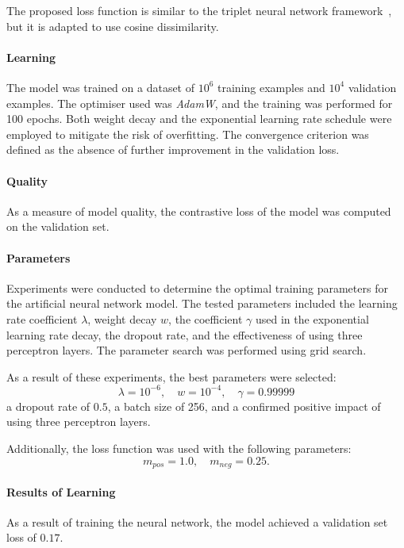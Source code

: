 \documentclass[biomedinformatics,article,submit,moreauthors]{Definitions/mdpi}
\begin{document}
                The proposed loss function is similar to the triplet neural network framework~\citep{hoffer2018deepmetriclearningusing}, but it is adapted to use cosine dissimilarity.

                \paragraph{Learning}
                The model was trained on a dataset of $10^{6}$ training examples and $10^{4}$ validation examples. The optimiser used was \textit{AdamW}, and the training was performed for 100 epochs.
                Both weight decay and the exponential learning rate schedule were employed
                to mitigate the risk of overfitting.
                The convergence criterion was defined as the absence of further improvement in the validation loss.

                \paragraph{Quality}
                As a measure of model quality, the contrastive loss of the model was computed on the validation set.

                \paragraph{Parameters}
                Experiments were conducted to determine the optimal training parameters for the artificial neural network model. The tested parameters included the learning rate coefficient \( \lambda \), weight decay \( w \), the coefficient \( \gamma \) used in the exponential learning rate decay, the dropout rate, and the effectiveness of using three perceptron layers. The parameter search was performed using grid search.

                As a result of these experiments, the best parameters were selected:
                \[
                \lambda = 10^{-6}, \quad w = 10^{-4}, \quad \gamma = 0.99999
                \]
                a dropout rate of \( 0.5 \), a batch size of 256, and a confirmed positive impact of using three perceptron layers.

                Additionally, the loss function was used with the following parameters:
                \[
                m_{pos} = 1.0, \quad m_{neg} = 0.25.
                \]

                \paragraph{Results of Learning}
                As a result of training the neural network, the model achieved a validation set loss of $0.17$.
\end{document}
